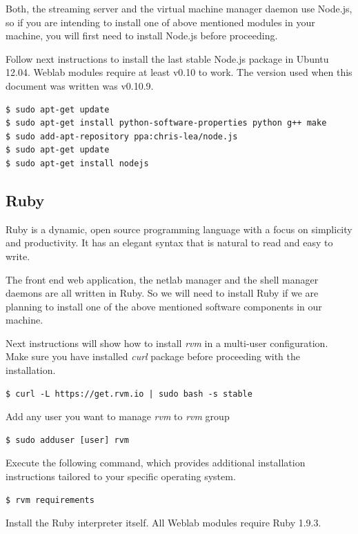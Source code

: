 \documentclass{article}
\begin{document}
Both, the streaming server and the virtual machine manager daemon use Node.js, so if you are intending to install one of above mentioned modules in your machine, you will first need to install Node.js before proceeding.

Follow next instructions to install the last stable Node.js package in Ubuntu 12.04. Weblab modules require at least v0.10 to work. The version used when this document was written was v0.10.9.

\begin{verbatim}
$ sudo apt-get update
$ sudo apt-get install python-software-properties python g++ make
$ sudo add-apt-repository ppa:chris-lea/node.js
$ sudo apt-get update
$ sudo apt-get install nodejs
\end{verbatim}

\subsection{Ruby}
Ruby is a dynamic, open source programming language with a focus on simplicity and productivity. It has an elegant syntax that is natural to read and easy to write.

The front end web application, the netlab manager and the shell manager daemons are all written in Ruby. So we will need to install Ruby if we are planning to install one of the above mentioned software components in our machine.

Next instructions will show how to install \textit{rvm} in a multi-user configuration. Make sure you have installed \textit{curl} package before proceeding with the installation.

\begin{verbatim}
$ curl -L https://get.rvm.io | sudo bash -s stable
\end{verbatim}

Add any user you want to manage \textit{rvm} to \textit{rvm} group
\begin{verbatim}
$ sudo adduser [user] rvm
\end{verbatim}

Execute the following command, which provides additional installation instructions tailored to your specific operating system.

\begin{verbatim}
$ rvm requirements
\end{verbatim}

Install the Ruby interpreter itself. All Weblab modules require Ruby 1.9.3.
\end{document}
